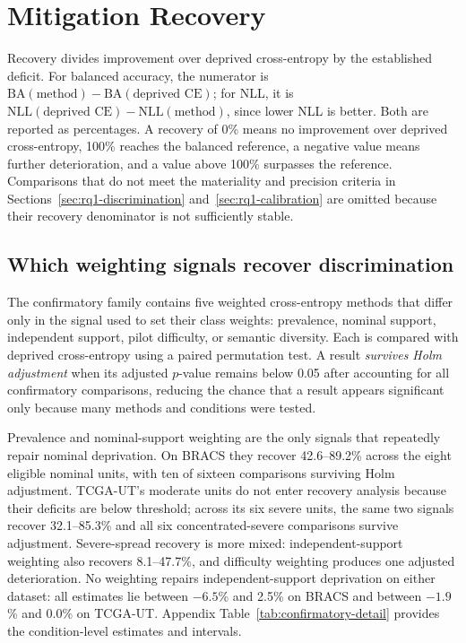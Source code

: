 \documentclass[11pt]{article}
\newcommand{\resultstable}[1]{}
\begin{document}
\section{Mitigation Recovery}
\label{sec:rq2}
Recovery divides improvement over deprived cross-entropy by the established deficit. For balanced accuracy, the numerator is $\mathrm{BA}(\text{method})-\mathrm{BA}(\text{deprived CE})$; for NLL, it is $\mathrm{NLL}(\text{deprived CE})-\mathrm{NLL}(\text{method})$, since lower NLL is better. Both are reported as percentages. A recovery of \num{0}\% means no improvement over deprived cross-entropy, \num{100}\% reaches the balanced reference, a negative value means further deterioration, and a value above \num{100}\% surpasses the reference. Comparisons that do not meet the materiality and precision criteria in Sections~\ref{sec:rq1-discrimination} and~\ref{sec:rq1-calibration} are omitted because their recovery denominator is not sufficiently stable.

\subsection{Which weighting signals recover discrimination}
\label{sec:rq2-family}
The confirmatory family contains five weighted cross-entropy methods that differ only in the signal used to set their class weights: prevalence, nominal support, independent support, pilot difficulty, or semantic diversity. Each is compared with deprived cross-entropy using a paired permutation test. A result \emph{survives Holm adjustment} when its adjusted $p$-value remains below \num{0.05} after accounting for all confirmatory comparisons, reducing the chance that a result appears significant only because many methods and conditions were tested.

\begin{table}[ht]
  \centering
  \scriptsize
  \setlength{\tabcolsep}{4pt}
  \resultstable{confirmatory_summary}
  \caption{Balanced-accuracy recovery by shortage and weighting signal. Ranges are percentages of the original deficit; the final column counts results that remain significant after Holm adjustment.}
  \label{tab:confirmatory}
\end{table}

\noindent Prevalence and nominal-support weighting are the only signals that repeatedly repair nominal deprivation. On BRACS they recover \num{42.6}--\num{89.2}\% across the eight eligible nominal units, with ten of sixteen comparisons surviving Holm adjustment. TCGA-UT's moderate units do not enter recovery analysis because their deficits are below threshold; across its six severe units, the same two signals recover \num{32.1}--\num{85.3}\% and all six concentrated-severe comparisons survive adjustment. Severe-spread recovery is more mixed: independent-support weighting also recovers \num{8.1}--\num{47.7}\%, and difficulty weighting produces one adjusted deterioration. No weighting repairs independent-support deprivation on either dataset: all estimates lie between $-\num{6.5}$\% and \num{2.5}\% on BRACS and between $-\num{1.9}$\% and \num{0.0}\% on TCGA-UT. Appendix Table~\ref{tab:confirmatory-detail} provides the condition-level estimates and intervals.
\end{document}
